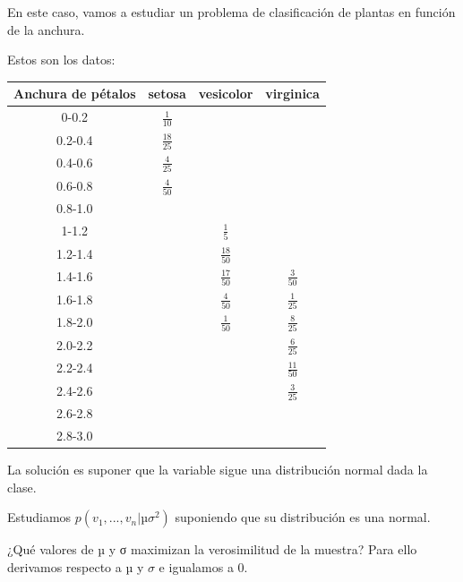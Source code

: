 \documentclass{apuntes}
\begin{document}
\begin{example}
En este caso, vamos a estudiar un problema de clasificación de plantas en función de la anchura.

Estos son los datos:

\begin{center}
\label{iris::datos}
\begin{tabular}{|c|c|c|c|}\hline
Anchura de pétalos & setosa & vesicolor & virginica \\[8pt]\hline\hline
0-0.2 & 	$\displaystyle\frac{1}{10}$ & & \\[8pt]\hline
0.2-0.4 & 	$\displaystyle\frac{18}{25}$ & & \\[8pt]\hline
0.4-0.6 & 	$\displaystyle\frac{4}{25}$ & & \\[8pt]\hline
0.6-0.8 & 	$\displaystyle\frac{4}{50}$ & & \\[8pt]\hline
0.8-1.0 & & &\\[8pt]\hline
1-1.2 &  & $\displaystyle\frac{1}{5}$ & \\[8pt]\hline
1.2-1.4 & 				 & $\displaystyle\frac{18}{50}$ & \\[8pt]\hline
1.4-1.6 & 				 & $\displaystyle\frac{17}{50}$ & $\displaystyle\frac{3}{50}$ \\[8pt]\hline
1.6-1.8 & 				 & $\displaystyle\frac{4}{50}$ &  $\displaystyle\frac{1}{25}$\\[8pt]\hline
1.8-2.0 & 				 & $\displaystyle\frac{1}{50}$ & $\displaystyle\frac{8}{25}$\\[8pt]\hline
2.0-2.2 & 				 & & $\displaystyle\frac{6}{25}$\\[8pt]\hline
2.2-2.4 & 				 & & $\displaystyle\frac{11}{50}$\\[8pt]\hline
2.4-2.6 & 				 & & $\displaystyle\frac{3}{25}$\\[8pt]\hline
2.6-2.8 & 				 & & \\[8pt]\hline
2.8-3.0 & 				 & & \\[8pt]\hline
\end{tabular}
\end{center}

La solución es suponer que la variable sigue una distribución normal dada la clase. 

\end{example}

Estudiamos $p(v_1,...,v_n | µσ^2)$ suponiendo que su distribución es una normal.

¿Qué valores de $µ$ y σ maximizan la verosimilitud de la muestra? Para ello derivamos respecto a $µ$ y $σ$ e igualamos a 0.
\end{document}
